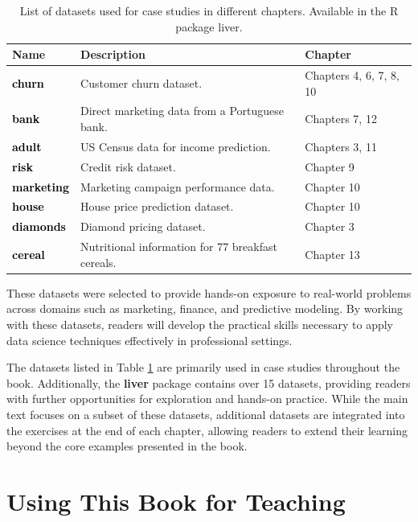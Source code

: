 \documentclass[
]{book}
\theoremstyle{definition}
\theoremstyle{definition}
\theoremstyle{definition}
\theoremstyle{definition}
\theoremstyle{remark}
\begin{document}
\begin{table}
\centering
\caption{\label{tab:data-table}List of datasets used for case studies in different chapters. Available in the R package liver.}
\centering
\begin{tabular}[t]{>{}l>{\raggedright\arraybackslash}p{20em}l}
\toprule
Name & Description & Chapter\\
\midrule
\textcolor{black}{\textbf{churn}} & Customer churn dataset. & Chapters 4, 6, 7, 8, 10\\
\textcolor{black}{\textbf{bank}} & Direct marketing data from a Portuguese bank. & Chapters 7, 12\\
\textcolor{black}{\textbf{adult}} & US Census data for income prediction. & Chapters 3, 11\\
\textcolor{black}{\textbf{risk}} & Credit risk dataset. & Chapter 9\\
\textcolor{black}{\textbf{marketing}} & Marketing campaign performance data. & Chapter 10\\
\addlinespace
\textcolor{black}{\textbf{house}} & House price prediction dataset. & Chapter 10\\
\textcolor{black}{\textbf{diamonds}} & Diamond pricing dataset. & Chapter 3\\
\textcolor{black}{\textbf{cereal}} & Nutritional information for 77 breakfast cereals. & Chapter 13\\
\bottomrule
\end{tabular}
\end{table}

These datasets were selected to provide hands-on exposure to real-world problems across domains such as marketing, finance, and predictive modeling. By working with these datasets, readers will develop the practical skills necessary to apply data science techniques effectively in professional settings.

The datasets listed in Table \ref{tab:data-table} are primarily used in case studies throughout the book. Additionally, the \textbf{liver} package contains over 15 datasets, providing readers with further opportunities for exploration and hands-on practice. While the main text focuses on a subset of these datasets, additional datasets are integrated into the exercises at the end of each chapter, allowing readers to extend their learning beyond the core examples presented in the book.

\section*{Using This Book for Teaching}\label{using-this-book-for-teaching}
\end{document}
